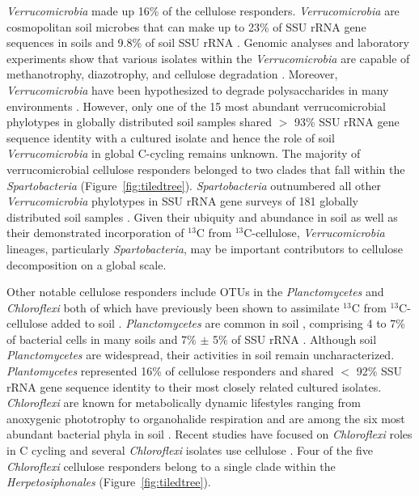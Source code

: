 \textit{Verrucomicrobia} made up 16\% of the cellulose responders.
\textit{Verrucomicrobia} are cosmopolitan soil microbes \citep{Bergmann_2011}
that can make up to 23\% of SSU rRNA gene sequences in soils
\citep{Bergmann_2011} and 9.8\% of soil SSU rRNA \citep{Buckley_2001}. Genomic
analyses and laboratory experiments show that various isolates
within the \textit{Verrucomicrobia} are capable of methanotrophy, diazotrophy,
and cellulose degradation \citep{Wertz_2011,Otsuka_2012}. Moreover,
\textit{Verrucomicrobia} have been hypothesized to degrade polysaccharides in
many environments \citep{Fierer_2013,10543821,Herlemann_2013}. However, only
one of the 15 most abundant verrucomicrobial phylotypes in globally distributed
soil samples shared $>$ 93\% SSU rRNA gene sequence identity with a cultured
isolate \citep{Bergmann_2011} and hence the role of soil
\textit{Verrucomicrobia} in global C-cycling remains unknown. The majority of
verrucomicrobial cellulose responders belonged to two clades that fall within
the \textit{Spartobacteria} (Figure~\ref{fig:tiledtree}).
\textit{Spartobacteria} outnumbered all other \textit{Verrucomicrobia}
phylotypes in SSU rRNA gene surveys of
181 globally distributed soil samples \citep{Bergmann_2011}. Given their ubiquity and abundance
in soil as well as their demonstrated incorporation of $^{13}$C from
$^{13}$C-cellulose, \textit{Verrucomicrobia} lineages, particularly
\textit{Spartobacteria}, may be important contributors to cellulose
decomposition on a global scale. 

Other notable cellulose responders include OTUs in the \textit{Planctomycetes}
and \textit{Chloroflexi} both of which have previously been shown to
assimilate $^{13}$C from $^{13}$C-cellulose added to soil
\citep{Schellenberger_2010}. \textit{Planctomycetes} are common in soil
\citep{Janssen2006}, comprising 4 to 7\% of bacterial cells in many soils
\citep{Zarda_1997,Chatzinotas_1998} and 7\% $\pm$ 5\% of SSU rRNA
\citep{buckley_2003}. Although soil \textit{Planctomycetes} are widespread,
their activities in soil remain uncharacterized. \textit{Plantomycetes}
represented 16\% of cellulose responders and shared $<$ 92\% SSU rRNA gene
sequence identity to their most closely related cultured isolates.
\textit{Chloroflexi} are known for metabolically dynamic lifestyles ranging
from anoxygenic phototrophy to organohalide respiration \citep{Hug_2013} and
are among the six most abundant bacterial phyla in soil \citep{Janssen2006}.
Recent studies have focused on \textit{Chloroflexi} roles in C cycling
\citep{Hug_2013,Goldfarb_2011,Cole_2013} and several \textit{Chloroflexi}
isolates use cellulose \citep{Hug_2013,Goldfarb_2011,Cole_2013}. Four of the
five \textit{Chloroflexi} cellulose responders belong to a single clade within
the \textit{Herpetosiphonales} (Figure~\ref{fig:tiledtree}). 

